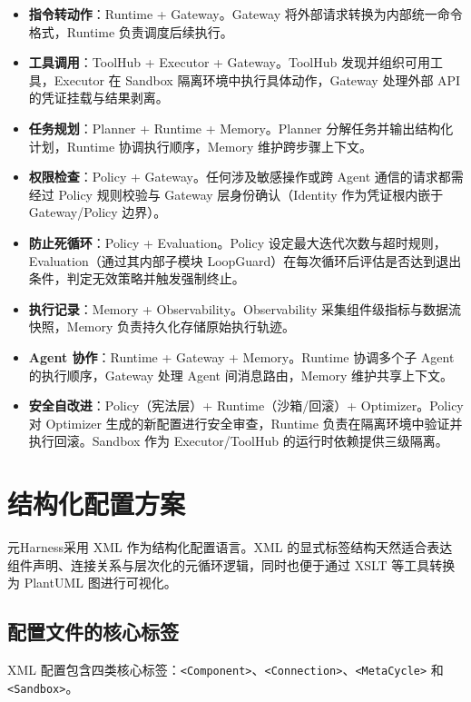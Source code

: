 \begin{itemize}
    \item \textbf{指令转动作}：Runtime + Gateway。Gateway 将外部请求转换为内部统一命令格式，Runtime 负责调度后续执行。
    \item \textbf{工具调用}：ToolHub + Executor + Gateway。ToolHub 发现并组织可用工具，Executor 在 Sandbox 隔离环境中执行具体动作，Gateway 处理外部 API 的凭证挂载与结果剥离。
    \item \textbf{任务规划}：Planner + Runtime + Memory。Planner 分解任务并输出结构化计划，Runtime 协调执行顺序，Memory 维护跨步骤上下文。
    \item \textbf{权限检查}：Policy + Gateway。任何涉及敏感操作或跨 Agent 通信的请求都需经过 Policy 规则校验与 Gateway 层身份确认（Identity 作为凭证根内嵌于 Gateway/Policy 边界）。
    \item \textbf{防止死循环}：Policy + Evaluation。Policy 设定最大迭代次数与超时规则，Evaluation（通过其内部子模块 LoopGuard）在每次循环后评估是否达到退出条件，判定无效策略并触发强制终止。
    \item \textbf{执行记录}：Memory + Observability。Observability 采集组件级指标与数据流快照，Memory 负责持久化存储原始执行轨迹。
    \item \textbf{Agent 协作}：Runtime + Gateway + Memory。Runtime 协调多个子 Agent 的执行顺序，Gateway 处理 Agent 间消息路由，Memory 维护共享上下文。
    \item \textbf{安全自改进}：Policy（宪法层）+ Runtime（沙箱/回滚）+ Optimizer。Policy 对 Optimizer 生成的新配置进行安全审查，Runtime 负责在隔离环境中验证并执行回滚。Sandbox 作为 Executor/ToolHub 的运行时依赖提供三级隔离。
\end{itemize}

\section{结构化配置方案}

元Harness采用 XML 作为结构化配置语言。XML 的显式标签结构天然适合表达组件声明、连接关系与层次化的元循环逻辑，同时也便于通过 XSLT 等工具转换为 PlantUML 图进行可视化。

\subsection{配置文件的核心标签}

XML 配置包含四类核心标签：\texttt{<Component>}、\texttt{<Connection>}、\texttt{<MetaCycle>} 和 \texttt{<Sandbox>}。

